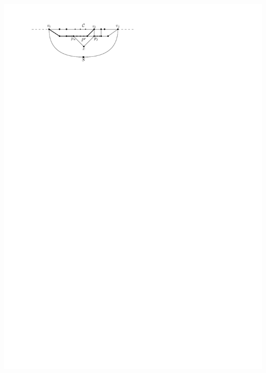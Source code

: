 \documentclass[a4paper]{article}
\begin{document}
\includegraphics[scale=1]{unifiedAlgo/img/sweep/cases/free2chord}
\clearpage%
\end{document}
